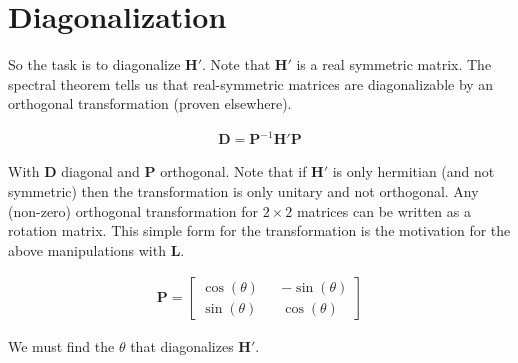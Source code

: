 \documentclass[12pt]{article}
\newcommand{\bv}[1]{\boldsymbol{#1}}
\begin{document}
\section{Diagonalization}

So the task is to diagonalize $\bv{H'}$. Note that $\bv{H}'$ is a real symmetric matrix. The spectral theorem tells us that real-symmetric matrices are diagonalizable by an orthogonal transformation (proven elsewhere).

\begin{align}
\bv{D} = \bv{P}^{-1} \bv{H}' \bv{P}
\end{align}

With $\bv{D}$ diagonal and $\bv{P}$ orthogonal. Note that if $\bv{H}'$ is only hermitian (and not symmetric) then the transformation is only unitary and not orthogonal. Any (non-zero) orthogonal transformation for $2\times2$ matrices can be written as a rotation matrix. This simple form for the transformation is the motivation for the above manipulations with $\bv{L}$.

\begin{align}
\bv{P} =
\begin{bmatrix}
\cos(\theta) && -\sin(\theta)\\
\sin(\theta) && \cos(\theta)
\end{bmatrix}
\end{align}

We must find the $\theta$ that diagonalizes $\bv{H}'$.
\end{document}
